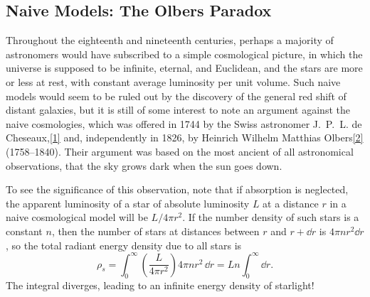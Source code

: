 
\subsection{Naive Models: The Olbers Paradox}\label{sec:16.1}

Throughout the eighteenth and nineteenth centuries, perhaps a majority of
astronomers would have subscribed to a simple cosmological picture, in which
the universe is supposed to be infinite, eternal, and Euclidean, and the stars
are more or less at rest, with constant average luminosity per unit volume.
Such naive models would seem to be ruled out by the discovery of the general
red shift of distant galaxies, but it is still of some interest to note an
argument against the naive cosmologies, which was offered in 1744 by the Swiss
astronomer J.~P.~L. de Cheseaux,\hyperref[ch16-ref-1]{[1]} and, independently
in 1826, by Heinrich Wilhelm Matthias
Olbers\hyperref[ch16-ref-2]{[2]} (1758--1840). Their argument was based on the
most ancient of all astronomical observations, that the sky grows dark when
the sun goes down.

To see the significance of this observation, note that if absorption is
neglected, the apparent luminosity of a star of absolute luminosity \(L\) at a
distance \(r\) in a naive cosmological model will be \(L/4\pi r^2\). If the
number density of such stars is a constant \(n\), then the number of stars at
distances between \(r\) and \(r+\dd r\) is \(4\pi nr^2\dd r\), so the total
radiant energy density due to all stars is
\begin{equation}
  \rho_s
  =
  \int_0^\infty
  \left(\frac{L}{4\pi r^2}\right)4\pi nr^2\,\dd r
  =
  Ln\int_0^\infty\dd r.
  \tag{16.1.1}\label{eq:16.1.1}
\end{equation}
The integral diverges, leading to an infinite energy density of starlight!

